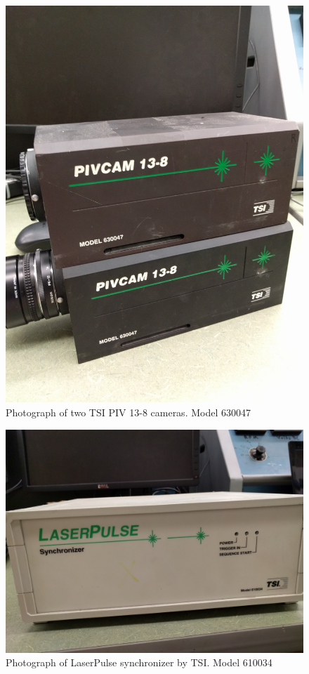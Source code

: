 \begin{figure}[H]
	\centering
	\includegraphics[width=5in]{figs/piv_method/piv_cams}
	\caption{Photograph of two TSI PIV 13-8 cameras. Model 630047}
	\label{fig:camera_picture}
\end{figure}

\begin{figure}[H]
	\centering
	\includegraphics[width=5in]{figs/piv_method/synchronizer}
	\caption{Photograph of LaserPulse synchronizer by TSI. Model 610034}
	\label{fig:synchronizer}
\end{figure}

